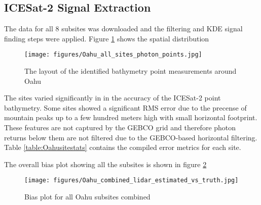 \subsection{ICESat-2 Signal Extraction}

The data for all 8 subsites was downloaded and the filtering and KDE signal finding steps were applied. Figure \ref{fig:oahu-all-photon-map} shows the spatial distribution

\begin{figure}[h!]
    \centering
    \texttt{[image: figures/Oahu\_all\_sites\_photon\_points.jpg]}
    \caption{The layout of the identified bathymetry point measurements around Oahu}
    \label{fig:oahu-all-photon-map}
\end{figure}

The sites varied significantly in in the accuracy of the ICESat-2 point bathymetry. Some sites showed a significant RMS error due to the precense of mountain peaks up to a few hundred meters high with small horizontal footprint. These features are not captured by the GEBCO grid and therefore photon returns below them are not filtered due to the GEBCO-based horizontal filtering. Table \ref{table:Oahusitestats} contains the compiled error metrics for each site.

 



The overall bias plot showing all the subsites is shown in figure \ref{fig:oahu-all-bias-plot}

\begin{figure}[h!]
    \centering
    \texttt{[image: figures/Oahu\_combined\_lidar\_estimated\_vs\_truth.jpg]}
    \caption{Bias plot for all Oahu subsites combined}
    \label{fig:oahu-all-bias-plot}
\end{figure}

